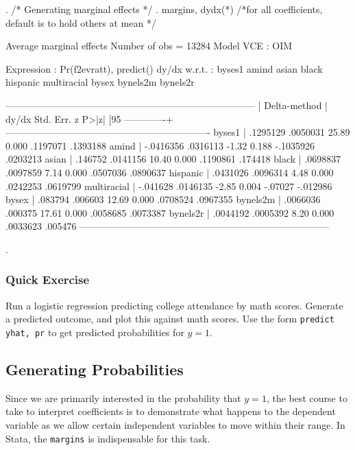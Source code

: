 \documentclass[12pt]{article}
\begin{document}
\begin{stlog}
. /* Generating marginal effects */
. margins, dydx(*) /*for all coefficients, default is to hold others at mean */  

Average marginal effects                          Number of obs   =      13284
Model VCE    : OIM

Expression   : Pr(f2evratt), predict()
dy/dx w.r.t. : byses1 amind asian black hispanic multiracial bysex bynels2m bynels2r

------------------------------------------------------------------------------
             |            Delta-method
             |      dy/dx   Std. Err.      z    P>|z|     [95%
-------------+----------------------------------------------------------------
      byses1 |   .1295129   .0050031    25.89   0.000     .1197071    .1393188
       amind |  -.0416356   .0316113    -1.32   0.188    -.1035926    .0203213
       asian |    .146752   .0141156    10.40   0.000     .1190861     .174418
       black |   .0698837   .0097859     7.14   0.000     .0507036    .0890637
    hispanic |   .0431026   .0096314     4.48   0.000     .0242253    .0619799
 multiracial |   -.041628   .0146135    -2.85   0.004      -.07027    -.012986
       bysex |    .083794    .006603    12.69   0.000     .0708524    .0967355
    bynels2m |   .0066036    .000375    17.61   0.000     .0058685    .0073387
    bynels2r |   .0044192   .0005392     8.20   0.000     .0033623     .005476
------------------------------------------------------------------------------

. 
\end{stlog}

\subsubsection{Quick Exercise}

Run a logistic regression predicting  college attendance by
math scores. Generate a predicted outcome, and plot this against
math scores. Use the form \texttt{predict yhat, pr} to get predicted
probabilities for $y=1$. 


\subsection{Generating Probabilities}

Since we are primarily interested in the probability that $y=1$, the
best course to take to interpret coefficients is to demonstrate what
happens to the dependent variable as we allow certain independent
variables to move within their range. In Stata, the \texttt{margins}
is indispensable for this task.
\end{document}
